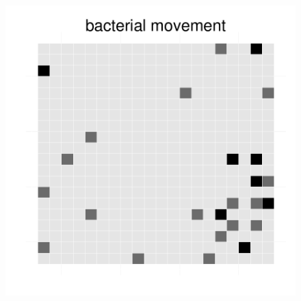 \begin{figure}[h!]
{\begin{minipage}[t]{0.3\textwidth}
  \end{minipage}
  \begin{minipage}[t]{0.3\textwidth}
    \includegraphics[width=\textwidth]{../results/ecoli_beijerinckii_20x20_seed5147_bac75.pdf}
  \end{minipage}
  }
\end{figure}
